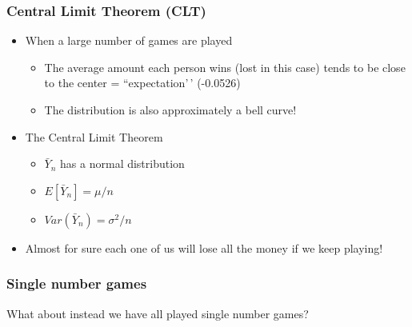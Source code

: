\documentclass[
  ignorenonframetext,
]{beamer}
\providecommand{\tightlist}{%
  \setlength{\itemsep}{0pt}\setlength{\parskip}{0pt}}
\begin{document}
\begin{frame}
\frametitle{Central Limit Theorem (CLT)}

\begin{itemize}
\tightlist
\item
  When a large number of games are played

  \begin{itemize}
  \tightlist
  \item
    The average amount each person wins (lost in this case) tends to be
    close to the center = ``expectation'\,' (-0.0526)
  \item
    The distribution is also approximately a bell curve!
  \end{itemize}
\item
  The Central Limit Theorem

  \begin{itemize}
  \tightlist
  \item
    \(\bar{Y}_n\) has a normal distribution
  \item
    \(E[\bar{Y}_n] = \mu /n\)
  \item
    \(Var(\bar{Y}_n) = \sigma^2 /n\)
  \end{itemize}
\item
  Almost for sure each one of us will lose all the money if we keep
  playing!
\end{itemize}
\end{frame}

\begin{frame}
\frametitle{Single number games}

\begin{center}
What about instead we have all played single number games? 
\end{center}
\end{frame}
\end{document}
